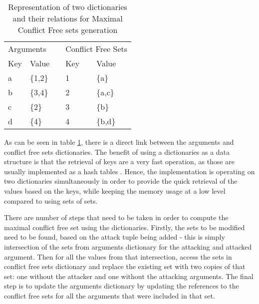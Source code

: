 \begin{table}[h]
	\centering
	\caption{Representation of two dictionaries and their relations for Maximal Conflict Free sets generation}
	\label{table:dictsRepresentation}
	\begin{tabular}{lllll}
		\multicolumn{2}{l}{Arguments}                            &                       & \multicolumn{2}{l}{Conflict Free Sets}                  \\ \cline{1-2} \cline{4-5} 
		\multicolumn{1}{|l|}{Key} & \multicolumn{1}{l|}{Value}   & \multicolumn{1}{l|}{} & \multicolumn{1}{l|}{Key} & \multicolumn{1}{l|}{Value}   \\ \cline{1-2} \cline{4-5} 
		\multicolumn{1}{|l|}{a}   & \multicolumn{1}{l|}{\{1,2\}} & \multicolumn{1}{l|}{} & \multicolumn{1}{l|}{1}   & \multicolumn{1}{l|}{\{a\}}   \\ \cline{1-2} \cline{4-5} 
		\multicolumn{1}{|l|}{b}   & \multicolumn{1}{l|}{\{3,4\}} & \multicolumn{1}{l|}{} & \multicolumn{1}{l|}{2}   & \multicolumn{1}{l|}{\{a,c\}} \\ \cline{1-2} \cline{4-5} 
		\multicolumn{1}{|l|}{c}   & \multicolumn{1}{l|}{\{2\}}   & \multicolumn{1}{l|}{} & \multicolumn{1}{l|}{3}   & \multicolumn{1}{l|}{\{b\}}   \\ \cline{1-2} \cline{4-5} 
		\multicolumn{1}{|l|}{d}   & \multicolumn{1}{l|}{\{4\}}   & \multicolumn{1}{l|}{} & \multicolumn{1}{l|}{4}   & \multicolumn{1}{l|}{\{b,d\}} \\ \cline{1-2} \cline{4-5} 
	\end{tabular}
\end{table}

As can be seen in table \ref{table:dictsRepresentation}, there is a direct link between the arguments and conflict free sets dictionaries. The benefit of using a dictionaries as a data structure is that the retrieval of keys are a very fast operation, as those are usually implemented as a hash tables \citep{pythonDictionary}. Hence, the implementation is operating on two dictionaries simultaneously in order to provide the quick retrieval of the values based on the keys, while keeping the memory usage at a low level compared to using sets of sets.


There are number of steps that need to be taken in order to compute the maximal conflict free set using the dictionaries. Firstly, the sets to be modified need to be found, based on the attack tuple being added - this is simply intersection of the sets from arguments dictionary for the attacking and attacked argument. Then for all the values from that intersection, access the sets in conflict free sets dictionary and replace the existing set with two copies of that set: one without the attacker and one without the attacking arguments. The final step is to update the arguments dictionary by updating the references to the conflict free sets for all the arguments that were included in that set.

